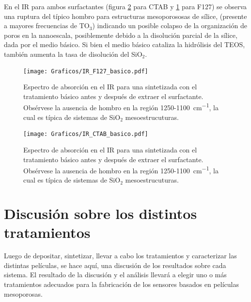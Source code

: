 {		En el IR para ambos surfactantes (figura \ref{fig:IR_CTAB_basico} para CTAB y \ref{fig:IR_F127_basico} para F127) se observa una ruptura del típico hombro para estructuras mesoporososas de sílice\cite{Olsen1989,Innocenzi2003,Angelome2008}, (presente a mayores frecuencias de TO$_3$) indicando un posible colapso de la organización de poros en la nanoescala, posiblemente debido a la disolución parcial de la sílice, dada por el medio básico. Si bien el medio básico cataliza la hidrólisis del TEOS, también aumenta la tasa de disolución del SiO$_2$.\cite{Mazer1994,Niibori2000,Gorrepati2010}

		\begin{figure}[!ht]
			\begin{center}
			\texttt{[image: Graficos/IR\_F127\_basico.pdf]}
			\caption[FTIR \pdmF\space tratamiento básico.]{Espectro de absorción en el IR para una \pdmF\space sintetizada con el tratamiento básico antes y después de extraer el surfactante. Obsérvese la ausencia de hombro en la región 1250-\SI{1100}{\cm^{-1}}, la cual es típica de sistemas de SiO$_2$ mesoestrucuturas.}
			\label{fig:IR_F127_basico}
			\end{center}
			\end{figure}

        \clearpage

		\begin{figure}[!ht]
			\begin{center}
			\texttt{[image: Graficos/IR\_CTAB\_basico.pdf]}
			\caption[FTIR \pdmC\space tratamiento básico.]{Espectro de absorción en el IR para una \pdmC\space sintetizada con el tratamiento básico antes y después de extraer el surfactante. Obsérvese la ausencia de hombro en la región 1250-\SI{1100}{\cm^{-1}}, la cual es típica de sistemas de SiO$_2$ mesoestrucuturas.}
			\label{fig:IR_CTAB_basico}
			\end{center}
			\end{figure}		

\section{Discusión sobre los distintos tratamientos}

		Luego de depositar, sintetizar, llevar a cabo los tratamientos y caracterizar las distintas películas, se hace aquí, una discusión de los resultados sobre cada sistema. El resultado de la discusión y el análisis llevará a elegir uno o más tratamientos adecuados para la fabricación de los sensores basados en películas mesoporosas.
 		
}
